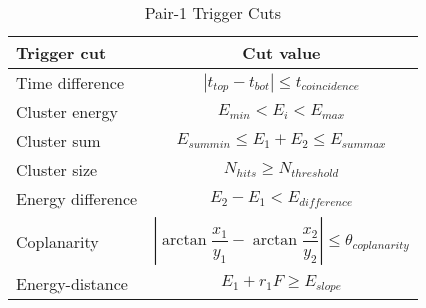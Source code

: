 \begin{table}[H]
\caption{Pair-1 Trigger Cuts}
\label{tab:pairTriggerCuts}
\centering
\begin{tabular}{lc}
\toprule
Trigger cut & Cut value \\
\midrule
Time difference & $| t_{top}-t_{bot} | \leq t_{coincidence}$   \\
Cluster energy & $E_{min}<E_{i}<E_{max}$\\
Cluster sum & $E_{sum min}\leq E_1+E_2\leq E_{sum max}$\\
Cluster size & $N_{hits}\geq N_{threshold}$\\
Energy difference & $ E_{2}-E_{1}<E_{difference}$\\
Coplanarity & $ |\arctan\dfrac{x_1}{y_1}-\arctan\dfrac{x_2}{y_2} | \leq \theta_{coplanarity}$\\
Energy-distance & $E_{1}+r_{1}F\geq E_{slope}$ \\ 
\bottomrule
\end{tabular}
\end{table}

